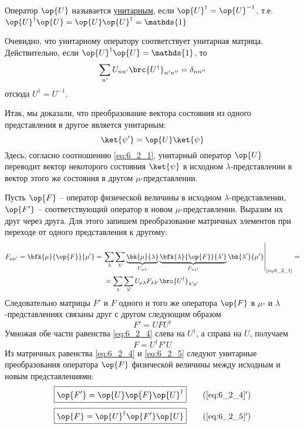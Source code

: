 \begin{defn}
Оператор $\op{U}$ называется \underline{унитарным}, если $\op{U}^\dag = \op{U}^{-1}$, т.е. $\op{U}^\dag\op{U}= \op{U}\op{U}^\dag= \mathds{1}$
\end{defn}

Очевидно, что унитарному оператору соответствует унитарная матрица. Действительно, если $\op{U}^\dag\op{U}=\mathds{1}$, то%
%
$$
\sum_{n'}U_{nn'} \brc{U^\dag}_{n'n''}=\delta_{nn''}
$$%
%
отсюда $U^\dag=U^{-1}$.

Итак, мы доказали, что преобразование вектора состояния из одного представления в другое является унитарным:
\begin{equation}
\label{eq:6_2_2}
\ket{\psi'}=\op{U}\ket{\psi}
\end{equation}%
%
Здесь, согласно соотношению \eqref{eq:6_2_1}, унитарный оператор $\op{U}$ переводит вектор некоторого состояния $\ket{\psi}$ в исходном $\lambda$-представлении в вектор этого же состояния в другом $\mu$-представлении.

Пусть $\op{F}$ -- оператор физической величины в исходном $\lambda$-представлении, $\op{F'}$ -- соответствующий оператор в новом $\mu$-представлении. Выразим их друг через друга. Для этого запишем преобразование матричных элементов при переходе от одного представления к другому:%
%
\begin{equation}
\begin{gathered}
\label{eq:6_2_3}
F_{\mu\mu'} =  \bfk{\mu}{\op{F}}{\mu'} = \left.
	\sum_\lambda \sum_{\lambda'} 
		\underbrace{\bk{\mu}{\lambda}}_{U_{\mu\lambda}}
		\underbrace{\bfk{\lambda}{\op{F}}{\lambda'}}_{F_{\lambda\lambda'}}
		\bk{\lambda'}{\mu'} \right|_{\text{\eqref{eq:6_2_1}}} = \\ =
	\sum_\lambda \sum_{\lambda'} U_{\mu\lambda} F_{\lambda\lambda'} \brc{U^\dag}_{\lambda'\mu'}
\end{gathered}	
\end{equation}%
%
Следовательно матрицы $F'$ и $F$ одного и того же оператора $\op{F}$ в $\mu$- и $\lambda$-представлениях связаны друг с другом следующим образом%
\begin{equation}
\label{eq:6_2_4}
\boxed{F'=U F U^\dag}
\end{equation}%
%
Умножая обе части равенства \eqref{eq:6_2_4} слева на $U^\dag$, а справа на $U$, получаем%
\begin{equation}
\label{eq:6_2_5}
\boxed{F=U^\dag F' U}
\end{equation}%
%
Из матричных равенства \eqref{eq:6_2_4} и \eqref{eq:6_2_5} следуют унитарные преобразования оператора $\op{F}$ физической величины между исходным и новым представлениями:%
%
\begin{equation}
\label{eq:6_2_4_add}
\boxed{\op{F'}=\op{U} \op{F} \op{U}^\dag}
\tag{\ref{eq:6_2_4}$'$}
\end{equation}%
%
\begin{equation}
\label{eq:6_2_5_add}
\boxed{\op{F}=\op{U}^\dag \op{F'} \op{U}}
\tag{\ref{eq:6_2_5}$'$}
\end{equation}%

